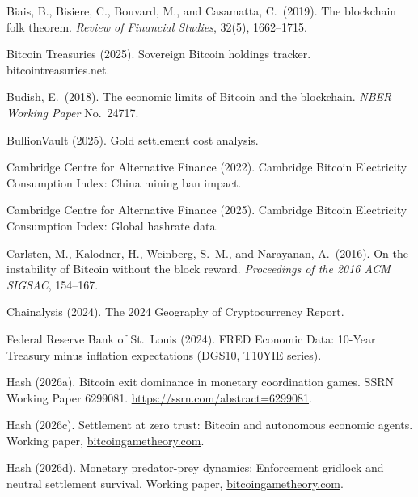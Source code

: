 \documentclass[12pt]{article}
\theoremstyle{definition}
\theoremstyle{remark}
\begin{document}
\begin{description}[style=nextline,leftmargin=0pt,labelsep=0pt,font=\normalfont]

\item Biais, B., Bisiere, C., Bouvard, M., and Casamatta, C.\ (2019). The
blockchain folk theorem. \emph{Review of Financial Studies}, 32(5), 1662--1715.

\item Bitcoin Treasuries (2025). Sovereign Bitcoin holdings tracker.
bitcointreasuries.net.

\item Budish, E.\ (2018). The economic limits of Bitcoin and the blockchain.
\emph{NBER Working Paper} No.~24717.

\item BullionVault (2025). Gold settlement cost analysis.

\item Cambridge Centre for Alternative Finance (2022). Cambridge Bitcoin
Electricity Consumption Index: China mining ban impact.

\item Cambridge Centre for Alternative Finance (2025). Cambridge Bitcoin
Electricity Consumption Index: Global hashrate data.

\item Carlsten, M., Kalodner, H., Weinberg, S.\ M., and Narayanan, A.\ (2016).
On the instability of Bitcoin without the block reward.
\emph{Proceedings of the 2016 ACM SIGSAC}, 154--167.

\item Chainalysis (2024). The 2024 Geography of Cryptocurrency Report.

\item Federal Reserve Bank of St.~Louis (2024). FRED Economic Data: 10-Year
Treasury minus inflation expectations (DGS10, T10YIE series).

\item Hash (2026a). Bitcoin exit dominance in monetary coordination games.
SSRN Working Paper 6299081. \url{https://ssrn.com/abstract=6299081}.

\item Hash (2026c). Settlement at zero trust: Bitcoin and autonomous economic
agents. Working paper, \url{bitcoingametheory.com}.

\item Hash (2026d). Monetary predator-prey dynamics: Enforcement gridlock
and neutral settlement survival. Working paper, \url{bitcoingametheory.com}.


\end{description}
\end{document}

